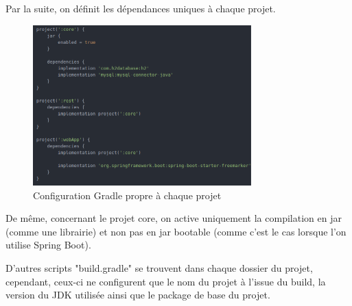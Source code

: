 			\newpage
			Par la suite, on définit les dépendances uniques à chaque projet.

			\begin{figure}[H]
				\centering\includegraphics[width=0.75\textwidth, keepaspectratio]{res/gradle_project.png}
				\caption{Configuration Gradle propre à chaque projet}
			\end{figure}

			De même, concernant le projet core, on active uniquement la compilation en jar (comme une librairie) et non pas en jar bootable (comme c'est le cas lorsque l'on utilise Spring Boot).

			\noindent
			D'autres scripts "build.gradle" se trouvent dans chaque dossier du projet, cependant, ceux-ci ne configurent que le nom du projet à l'issue du build, la version du JDK utilisée ainsi que le package de base du projet.
